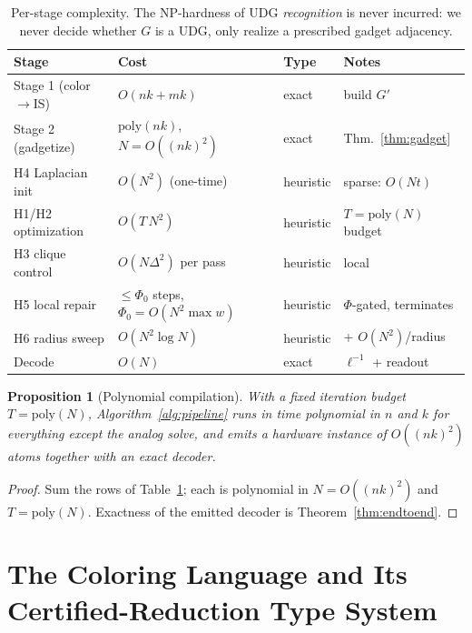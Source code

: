 \documentclass[11pt]{article}
\newtheorem{proposition}[theorem]{Proposition}
\theoremstyle{definition}
\theoremstyle{remark}
\begin{document}
\begin{table}[h]
\centering
\begin{tabular}{@{}llll@{}}
\toprule
Stage & Cost & Type & Notes \\
\midrule
Stage 1 (color$\to$IS) & $O(nk+mk)$ & exact & build $G'$ \\
Stage 2 (gadgetize)    & $\mathrm{poly}(nk)$, $N=O((nk)^2)$ & exact & Thm.~\ref{thm:gadget} \\
H4 Laplacian init      & $O(N^2)$ (one-time) & heuristic & sparse: $O(Nt)$ \\
H1/H2 optimization     & $O(T\,N^2)$ & heuristic & $T=\mathrm{poly}(N)$ budget \\
H3 clique control      & $O(N\Delta^2)$ per pass & heuristic & local \\
H5 local repair        & $\le \Phi_0$ steps, $\Phi_0=O(N^2\max w)$ & heuristic & $\Phi$-gated, terminates \\
H6 radius sweep        & $O(N^2\log N)$ & heuristic & + $O(N^2)$/radius \\
Decode                 & $O(N)$ & exact & $\ell^{-1}$ + readout \\
\bottomrule
\end{tabular}
\caption{Per-stage complexity. The NP-hardness of UDG \emph{recognition}
\cite{Breu1998} is never incurred: we never decide whether $G$ is a UDG, only
realize a prescribed gadget adjacency.}
\label{tab:complexity}
\end{table}

\begin{proposition}[Polynomial compilation]
With a fixed iteration budget $T=\mathrm{poly}(N)$, Algorithm~\ref{alg:pipeline}
runs in time polynomial in $n$ and $k$ for everything except the analog solve, and
emits a hardware instance of $O((nk)^2)$ atoms together with an exact decoder.
\end{proposition}

\begin{proof}
Sum the rows of Table~\ref{tab:complexity}; each is polynomial in $N=O((nk)^2)$ and
$T=\mathrm{poly}(N)$. Exactness of the emitted decoder is Theorem~\ref{thm:endtoend}.
\end{proof}

\section{The Coloring Language and Its Certified-Reduction Type System}
\label{sec:lang}
\end{document}
